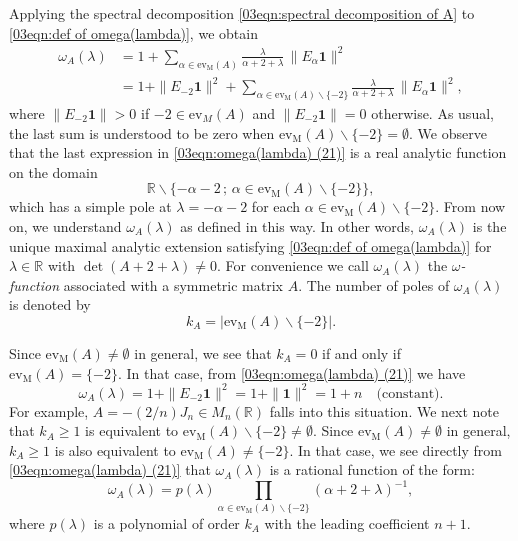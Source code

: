 \documentclass[12pt,a4paper]{article}
\newcommand{\1}{{\bm 1}}
\numberwithin{equation}{section}
\begin{document}
Applying the spectral decomposition 
\eqref{03eqn:spectral decomposition of A} to
\eqref{03eqn:def of omega(lambda)}, we obtain
%
\begin{align}
\omega_A(\lambda)
&=1+\sum_{\alpha\in\mathrm{ev}_{\mathrm{M}}(A)} 
 \frac{\lambda}{\alpha+2+\lambda} \,\|E_\alpha\mathbf{1}\|^2
\nonumber \\
&=1+\|E_{-2}\mathbf{1}\|^2
 +\sum_{\alpha\in\mathrm{ev}_{\mathrm{M}}(A)\backslash\{-2\}} 
 \frac{\lambda}{\alpha+2+\lambda} \,\|E_\alpha\mathbf{1}\|^2,
\label{03eqn:omega(lambda) (21)}
\end{align}
%
where $\|E_{-2}\mathbf{1}\|>0$ if $-2\in\mathrm{ev}_M(A)$
and $\|E_{-2}\mathbf{1}\|=0$ otherwise.
As usual, the last sum is understood to be zero when
$\mathrm{ev}_{\mathrm{M}}(A)\backslash\{-2\}=\emptyset$.
We observe that the last expression in \eqref{03eqn:omega(lambda) (21)}
is a real analytic function on the domain
%
\begin{equation}\label{03eqn:domain of omega}
\mathbb{R}\backslash
\{-\alpha-2\,;\,\alpha\in\mathrm{ev}_{\mathrm{M}}(A)\backslash\{-2\}\},
\end{equation}
%
which has a simple pole at $\lambda=-\alpha-2$ for each
$\alpha\in\mathrm{ev}_{\mathrm{M}}(A)\backslash\{-2\}$.
From now on, we understand $\omega_A(\lambda)$ as defined in this way.
In other words, $\omega_A(\lambda)$ is the unique maximal
analytic extension satisfying \eqref{03eqn:def of omega(lambda)}
for $\lambda\in\mathbb{R}$ with $\det(A+2+\lambda)\neq0$.
For convenience we call $\omega_A(\lambda)$ the 
\textit{$\omega$-function} associated with a symmetric matrix $A$.
The number of poles of $\omega_A(\lambda)$ is denoted by
%
\begin{equation}\label{03eqn:def of k_A}
k_A=|\mathrm{ev}_{\mathrm{M}}(A)\backslash\{-2\}|.
\end{equation}

Since $\mathrm{ev}_{\mathrm{M}}(A)\neq\emptyset$ in general,
we see that $k_A=0$ if and only if $\mathrm{ev}_{\mathrm{M}}(A)=\{-2\}$.
In that case, from \eqref{03eqn:omega(lambda) (21)} we have
%
\begin{equation}\label{03eqn:omega(lambda)=const}
\omega_A(\lambda)
=1+\|E_{-2}\mathbf{1}\|^2
=1+\|\mathbf{1}\|^2
=1+n\quad\text{(constant)}.
\end{equation}
%
For example, $A=-(2/n)J_n\in M_n(\mathbb{R})$ falls
into this situation.
We next note that $k_A\ge1$ is equivalent to
$\mathrm{ev}_{\mathrm{M}}(A)\backslash\{-2\}\neq\emptyset$.
Since $\mathrm{ev}_{\mathrm{M}}(A)\neq\emptyset$ in general,
$k_A\ge1$ is also equivalent to $\mathrm{ev}_{\mathrm{M}}(A)\neq\{-2\}$.
In that case, we see directly from \eqref{03eqn:omega(lambda) (21)}
that $\omega_A(\lambda)$ is a rational function of the form:
%
\begin{equation}\label{03eqn:omega(lambda) as rational function}
\omega_A(\lambda)
=p(\lambda)\prod_{\alpha\in\mathrm{ev}_{\mathrm{M}}(A)\backslash\{-2\}}
 (\alpha+2+\lambda)^{-1},
\end{equation}
%
where $p(\lambda)$ is a polynomial of order $k_A$ with
the leading coefficient $n+1$.
\end{document}
